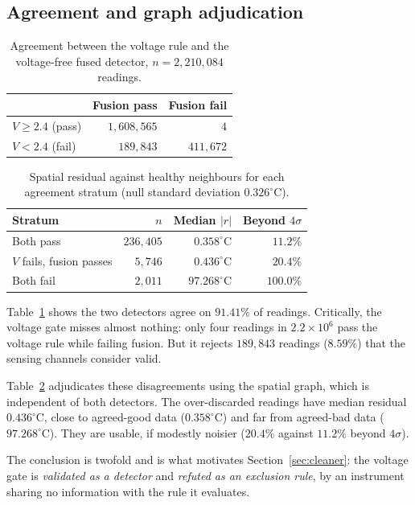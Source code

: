 \documentclass[conference]{IEEEtran}
\begin{document}
\subsection{Agreement and graph adjudication}

\begin{table}[t]
\caption{Agreement between the voltage rule and the voltage-free fused
detector, $n = 2{,}210{,}084$ readings.}
\label{tab:agree}
\centering
\begin{tabular}{lrr}
\toprule
 & Fusion pass & Fusion fail \\
\midrule
$V \ge 2.4$ (pass) & $1{,}608{,}565$ & $4$ \\
$V < 2.4$ (fail)   & $189{,}843$ & $411{,}672$ \\
\bottomrule
\end{tabular}
\end{table}

\begin{table}[t]
\caption{Spatial residual against healthy neighbours for each agreement
stratum (null standard deviation $0.326^\circ$C).}
\label{tab:adjudicate}
\centering
\begin{tabular}{lrrr}
\toprule
Stratum & $n$ & Median $|r|$ & Beyond $4\sigma$ \\
\midrule
Both pass                  & $236{,}405$ & $0.358^\circ$C & $11.2\%$ \\
$V$ fails, fusion passes   & $5{,}746$ & $0.436^\circ$C & $20.4\%$ \\
Both fail                  & $2{,}011$ & $97.268^\circ$C & $100.0\%$ \\
\bottomrule
\end{tabular}
\end{table}

Table~\ref{tab:agree} shows the two detectors agree on $91.41\%$ of readings.
Critically, the voltage gate misses almost nothing: only four readings in
$2.2 \times 10^6$ pass the voltage rule while failing fusion. But it rejects
$189{,}843$ readings ($8.59\%$) that the sensing channels consider valid.

Table~\ref{tab:adjudicate} adjudicates these disagreements using the spatial
graph, which is independent of both detectors. The over-discarded readings have
median residual $0.436^\circ$C, close to agreed-good data ($0.358^\circ$C) and
far from agreed-bad data ($97.268^\circ$C). They are usable, if modestly
noisier ($20.4\%$ against $11.2\%$ beyond $4\sigma$).

The conclusion is twofold and is what motivates Section~\ref{sec:cleaner}: the
voltage gate is \emph{validated as a detector} and \emph{refuted as an
exclusion rule}, by an instrument sharing no information with the rule it
evaluates.
\end{document}

